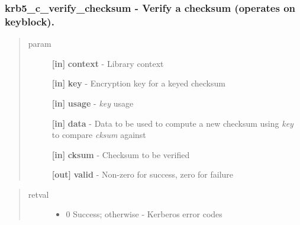 \documentclass[letterpaper,10pt,english]{sphinxmanual}
\begin{document}
\subsubsection{krb5\_c\_verify\_checksum -  Verify a checksum (operates on keyblock).}
\label{appdev/refs/api/krb5_c_verify_checksum:krb5-c-verify-checksum-verify-a-checksum-operates-on-keyblock}\label{appdev/refs/api/krb5_c_verify_checksum::doc}

\begin{fulllineitems}
\label{appdev/refs/api/krb5_c_verify_checksum:c.krb5_c_verify_checksum}
\end{fulllineitems}

\begin{quote}\begin{description}
\item[{param}] \leavevmode
\textbf{{[}in{]}} \textbf{context} - Library context

\textbf{{[}in{]}} \textbf{key} - Encryption key for a keyed checksum

\textbf{{[}in{]}} \textbf{usage} - \emph{key} usage

\textbf{{[}in{]}} \textbf{data} - Data to be used to compute a new checksum using \emph{key} to compare \emph{cksum} against

\textbf{{[}in{]}} \textbf{cksum} - Checksum to be verified

\textbf{{[}out{]}} \textbf{valid} - Non-zero for success, zero for failure

\end{description}\end{quote}
\begin{quote}\begin{description}
\item[{retval}] \leavevmode\begin{itemize}
\item {} 
0   Success; otherwise - Kerberos error codes

\end{itemize}

\end{description}\end{quote}
\end{document}
